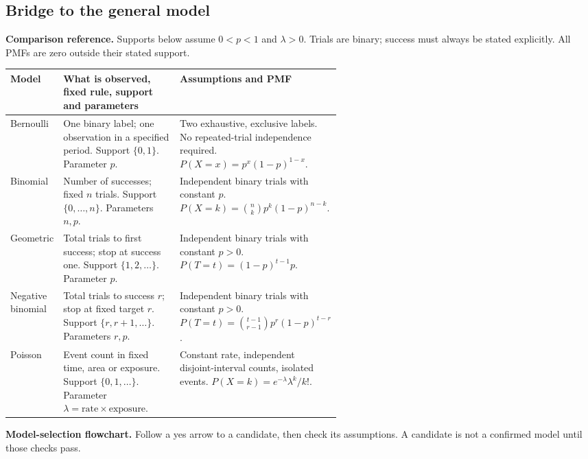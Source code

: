 \subsection{Bridge to the general model}
\textbf{Comparison reference.} Supports below assume $0<p<1$ and $\lambda>0$. Trials are binary; success must always be stated explicitly. All PMFs are zero outside their stated support.
\begin{center}\small
\begin{tabularx}{\linewidth}{@{}p{0.13\linewidth}p{0.43\linewidth}X@{}}
\toprule Model & What is observed, fixed rule, support and parameters & Assumptions and PMF\\\midrule
Bernoulli & One binary label; one observation in a specified period. Support $\{0,1\}$. Parameter $p$. & Two exhaustive, exclusive labels. No repeated-trial independence required. $P(X=x)=p^x(1-p)^{1-x}$.\\[5pt]
Binomial & Number of successes; fixed $n$ trials. Support $\{0,\ldots,n\}$. Parameters $n,p$. & Independent binary trials with constant $p$. $P(X=k)=\binom nkp^k(1-p)^{n-k}$.\\[5pt]
Geometric & Total trials to first success; stop at success one. Support $\{1,2,\ldots\}$. Parameter $p$. & Independent binary trials with constant $p>0$. $P(T=t)=(1-p)^{t-1}p$.\\[5pt]
Negative binomial & Total trials to success $r$; stop at fixed target $r$. Support $\{r,r+1,\ldots\}$. Parameters $r,p$. & Independent binary trials with constant $p>0$. $P(T=t)=\binom{t-1}{r-1}p^r(1-p)^{t-r}$.\\[5pt]
Poisson & Event count in fixed time, area or exposure. Support $\{0,1,\ldots\}$. Parameter $\lambda=\text{rate}\times\text{exposure}$. & Constant rate, independent disjoint-interval counts, isolated events. $P(X=k)=e^{-\lambda}\lambda^k/k!$.\\
\bottomrule
\end{tabularx}\end{center}
\textbf{Model-selection flowchart.} Follow a yes arrow to a candidate, then check its assumptions. A candidate is not a confirmed model until those checks pass.
